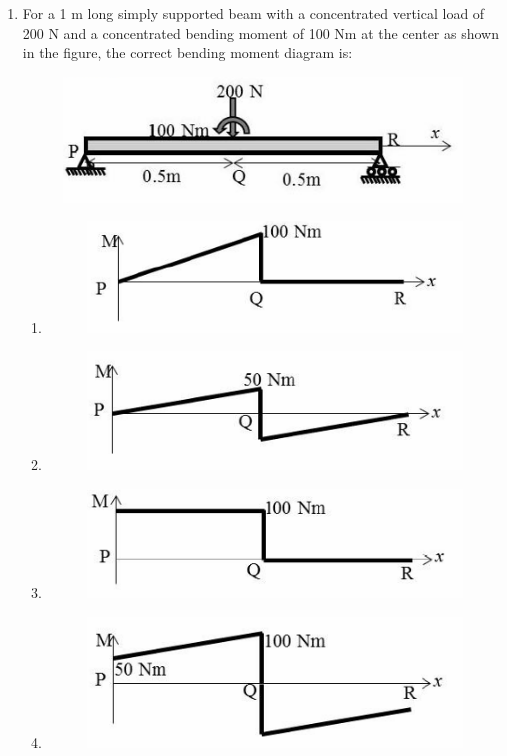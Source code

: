\documentclass{article}
\begin{document}
\begin{enumerate}[leftmargin=*, resume]
\item For a 1 m long simply supported beam with a concentrated vertical load of 200 N and a concentrated bending moment of 100 Nm at the center as shown in the figure, the correct bending moment diagram is:
\begin{figure}[H]
    \centering
    \includegraphics[width=0.5\linewidth]{figs/q37.png}
    \caption{}
    \label{fig:q37}
\end{figure}
\begin{enumerate}
\item \begin{figure}[H]
    \includegraphics[width=0.3\linewidth]{figs/q37(a).png}
    \caption{}
    \label{fig:q37(a)}
\end{figure}
\item \begin{figure}[H]
    \includegraphics[width=0.3\linewidth]{figs/q37(b).png}
    \caption{}
    \label{fig:q37(b)}
\end{figure}
\item \begin{figure}[H]
    \includegraphics[width=0.3\linewidth]{figs/q37(c).png}
    \caption{}
    \label{fig:q37(c)}
\end{figure}
\item \begin{figure}[H]
    \includegraphics[width=0.3\linewidth]{figs/q37(d).png}
    \caption{}
    \label{fig:q37(d)}
\end{figure}
\end{enumerate}


\end{enumerate}
\end{document}
